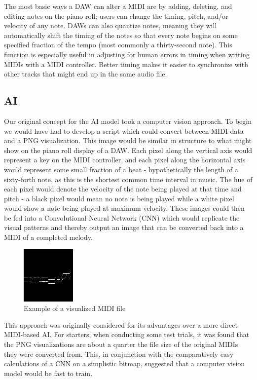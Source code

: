 The most basic ways a DAW can alter a MIDI are by adding, deleting, and editing notes on
the piano roll; users can change the timing, pitch, and/or velocity of any note. DAWs can
also quantize notes, meaning they will automatically shift the timing of the notes so that
every note begins on some specified fraction of the tempo (most commonly a thirty-second
note). This function is especially useful in adjusting for human errors in timing when
writing MIDIs with a MIDI controller. Better timing makes it easier to synchronize with
other tracks that might end up in the same audio file.


\subsection{AI}

Our original concept for the AI model took a computer vision approach. To begin we would
have had to develop a script which could convert between MIDI data and a PNG
visualization. This image would be similar in structure to what might show on the piano
roll display of a DAW. Each pixel along the vertical axis would represent a key on the
MIDI controller, and each pixel along the horizontal axis would represent some small
fraction of a beat - hypothetically the length of a sixty-forth note, as this is the
shortest common time interval in music. The hue of each pixel would denote the velocity
of the note being played at that time and pitch - a black pixel would mean no note is
being played while a white pixel would show a note being played at maximum velocity.
These images could then be fed into a Convolutional Neural Network (CNN) which would
replicate the visual patterns and thereby output an image that can be converted back into
a MIDI of a completed melody.

\begin{figure}[h!]
  \centering
  \includegraphics{image/MIDIsample.png}
  \caption{Example of a visualized MIDI file}
  \label{fig:midi_sample}
\end{figure}

This approach was originally considered for its advantages over a more direct MIDI-based
AI. For starters, when conducting some test trials, it was found that the PNG
visualizations are about a quarter the file size of the original MIDIs they were converted
from. This, in conjunction with the comparatively easy calculations of a CNN on a
simplistic bitmap, suggested that a computer vision model would be fast to train.

